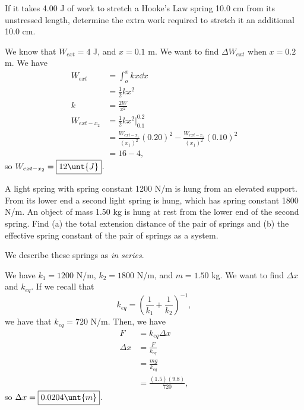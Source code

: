 \documentclass[11pt]{article}
\begin{document}
\begin{example}
	If it takes 4.00 J of work to stretch a Hooke's Law spring 10.0 cm from its unstressed length, determine the extra work required to stretch it an additional 10.0 cm.
\end{example}
\begin{solution}
	We know that $W_{ext} = 4$ J, and $x = 0.1$ m. We want to find $\Delta W_{ext}$ when $x = 0.2$ m. We have
	\begin{align*}
		W_{ext} &= \int_o^x kx \dd x \\
		&= \frac{1}{2}kx^2 \\
		k &= \frac{2W}{x^2} \\
		W_{ext-x_2} &= \frac{1}{2}kx^2 \Big|_{0.1}^{0.2} \\
		&= \frac{W_{ext-x_1}}{(x_1)^2}(0.20)^2 - \frac{W_{ext-x_1}}{(x_1)^2}(0.10)^2 \\
		&= 16 - 4,
	\end{align*}
	so $W_{ext-x_2} = \boxed{12\unt{J}}$.
\end{solution}

\begin{example}
	A light spring with spring constant 1200 N/m is hung from an elevated support. From its lower end a second light spring is hung, which has spring constant 1800 N/m. An object of mass 1.50 kg is hung at rest from the lower end of the second spring. Find (a) the total extension distance of the pair of springs and (b) the effective spring constant of the pair of springs as a system.
\end{example}
\begin{remark}
	We describe these springs as \textit{in series}.
\end{remark}
\begin{solution}
	We have $k_1 = 1200$ N/m, $k_2 = 1800$ N/m, and $m = 1.50$ kg. We want to find $\Delta x$ and $k_{eq}$. If we recall that
	\[k_{eq} = \left(\frac{1}{k_1} + \frac{1}{k_2}\right)^{-1},\]
	we have that $k_{eq} = 720$ N/m. Then, we have
	\begin{align*}
		F &= k_{eq} \Delta x \\
		\Delta x &= \frac{F}{k_{eq}} \\
		&= \frac{mg}{k_{eq}} \\
		&= \frac{(1.5)(9.8)}{720},
	\end{align*}
	so $\Delta x = \boxed{0.0204 \unt{m}}$.
\end{solution}
\end{document}
